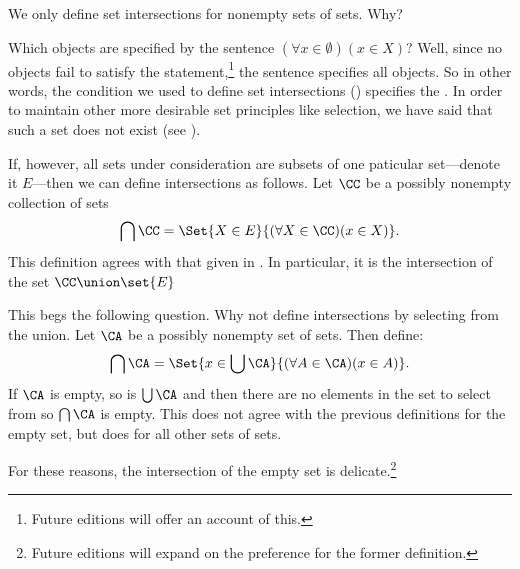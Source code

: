 

We only define set intersections for nonempty sets of sets.
Why?


Which objects are specified by the sentence $(\forall x \in \emptyset)(x \in X)$?
Well, since no objects fail to satisfy the statement,\footnote{Future editions will offer an account of this.} the sentence specifies all objects.
So in other words, the condition we used to define set intersections () specifies the .
In order to maintain other more desirable set principles like selection, we have said that such a set does not exist (see ).

If, however, all sets under consideration are subsets of one paticular set---denote it $E$---then we can define intersections as follows.
Let $\CC$ be a possibly nonempty collection of sets
\[
  \bigcap \CC = \Set{X \in E}{(\forall X \in \CC)(x \in X)}.
\]
This definition agrees with that given in .
In particular, it is the intersection of the set $\CC \union \set{E}$



This begs the following question.
Why not define intersections by selecting from the union.
Let $\CA$ be a possibly nonempty set of sets.
Then define:
\[
  \bigcap \CA = \Set{x \in \bigcup \CA}{(\forall A \in \CA)(x \in A)}.
\]
If $\CA$ is empty, so is $\bigcup \CA$ and then there are no elements in the set to select from so $\bigcap\CA$ is empty.
This does not agree with the previous definitions for the empty set, but does for all other sets of sets.

For these reasons, the intersection of the empty set is delicate.\footnote{Future editions will expand on the preference for the former definition.}
